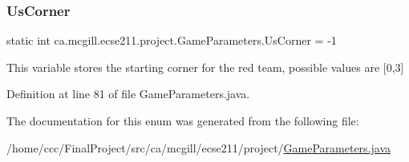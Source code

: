 \mbox{\label{enumca_1_1mcgill_1_1ecse211_1_1project_1_1_game_parameters_a5268b4efd3f069f08cca810e309b51dd}} 
\subsubsection{\texorpdfstring{Us\+Corner}{UsCorner}}
{\footnotesize\ttfamily  static  int ca.\+mcgill.\+ecse211.\+project.\+Game\+Parameters.\+Us\+Corner = -\/1\hspace{0.3cm}{\ttfamily [static]}}

This variable stores the starting corner for the red team, possible values are \mbox{[}0,3\mbox{]} 

Definition at line 81 of file Game\+Parameters.\+java.



The documentation for this enum was generated from the following file\+:\begin{DoxyCompactItemize}
\item 
/home/ccc/\+Final\+Project/src/ca/mcgill/ecse211/project/\hyperlink{_game_parameters_8java}{Game\+Parameters.\+java}\end{DoxyCompactItemize}
